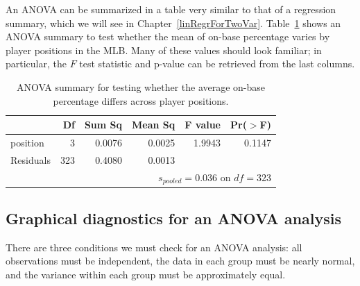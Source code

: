 An ANOVA can be summarized in a table very similar to that of a regression summary, which we will see in Chapter~\ref{linRegrForTwoVar}. Table~\ref{anovaSummaryTableForOBPAgainstPosition} shows an ANOVA summary to test whether the mean of on-base percentage varies by player positions in the MLB. Many of these values should look familiar; in particular, the $F$ test statistic and p-value can be retrieved from the last columns.

\begin{table}[ht]
\centering
\begin{tabular}{lrrrrr}
  \hline
 & Df & Sum Sq & Mean Sq & F value & Pr($>$F) \\
  \hline
position & 3 & 0.0076 & 0.0025 & 1.9943 & 0.1147 \\
  Residuals & 323 & 0.4080 & 0.0013 &  &  \\    \hline
\multicolumn{6}{r}{$s_{pooled} = 0.036$ on $df=323$}
\end{tabular}
\caption{ANOVA summary for testing whether the average on-base percentage differs across player positions.}
\label{anovaSummaryTableForOBPAgainstPosition}
\end{table}


\subsection{Graphical diagnostics for an ANOVA analysis}

There are three conditions we must check for an ANOVA analysis: all observations must be independent, the data in each group must be nearly normal, and the variance within each group must be approximately equal.

